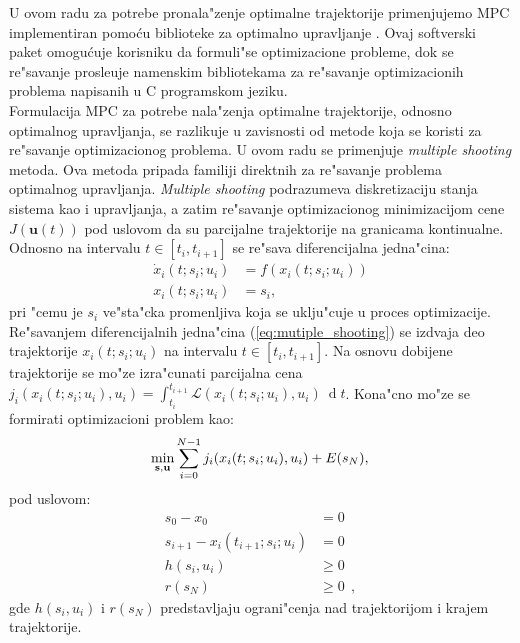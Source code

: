\documentclass[a4paper,11pt]{article}
\theoremstyle{definition} \newtheorem{deff}{Definicija}[section]
\theoremstyle{definition} \newtheorem{prim}[deff]{Primer}
\theoremstyle{plain} \newtheorem{teor}[deff]{Teorema}
\begin{document}
	U ovom radu za potrebe pronala"zenje optimalne trajektorije primenjujemo MPC implementiran pomo\'cu biblioteke za optimalno upravljanje \cite{CASADI}. Ovaj softverski paket omogu\'cuje korisniku da formuli"se optimizacione probleme, dok se re"savanje prosle\dj uje namenskim bibliotekama za re"savanje optimizacionih problema napisanih u C programskom jeziku. \\
	
	 Formulacija MPC za potrebe nala"zenja optimalne trajektorije, odnosno optimalnog upravljanja, se razlikuje u zavisnosti od metode koja se koristi za re"savanje optimizacionog problema. U ovom radu se primenjuje \emph{multiple shooting} metoda. Ova metoda pripada familiji direktnih za re"savanje problema optimalnog upravljanja. \emph{Multiple shooting} podrazumeva diskretizaciju stanja sistema kao i upravljanja, a zatim re"savanje optimizacionog minimizacijom cene $J(\mathbf{u}(t))$ pod uslovom da su parcijalne trajektorije na granicama kontinualne. Odnosno na intervalu $t\in[t_i, t_{i+1}]$ se re"sava diferencijalna jedna"cina:
	\begin{align}\label{eq:mutiple_shooting}
		\dot{x}_i(t; s_i; u_i) &= f(x_i(t; s_i; u_i)) \\
		x_i(t; s_i; u_i) &= s_i,
	\end{align}
	pri "cemu je $s_i$ ve"sta"cka promenljiva koja se uklju"cuje u proces optimizacije. Re"savanjem diferencijalnih jedna"cina (\ref{eq:mutiple_shooting}) se izdvaja deo trajektorije $x_i(t; s_i; u_i)$ na intervalu $t\in[t_i, t_{i+1}]$. Na osnovu dobijene trajektorije se mo"ze izra"cunati parcijalna cena $j_i(x_i(t; s_i; u_i), u_i) = \int_{t_i}^{t_{i+1}}\mathcal{L}(x_i(t; s_i; u_i), u_i)~\operatorname{d}t$. Kona"cno mo"ze se formirati optimizacioni problem kao:
	\begin{equation}\label{eq:multiple_minimize}
		\min_{\mathbf{s}, \mathbf{u}} \sum_{i=0}^{N-1} j_i(x_i(t; s_i; u_i), u_i) + E(s_N), \\
	\end{equation}pod uslovom:
	\begin{align}
		s_0 - x_0 &= 0\\
		s_{i+1} - x_i(t_{i+1}; s_i; u_i) &= 0\\
		h(s_i, u_i) &\geq 0\\
		r(s_N) &\geq 0 ~~,
	\end{align} gde $h(s_i, u_i)$ i $r(s_N)$ predstavljaju ograni"cenja nad trajektorijom i krajem trajektorije. \cite{multiple_shooting}\\
	
\end{document}
